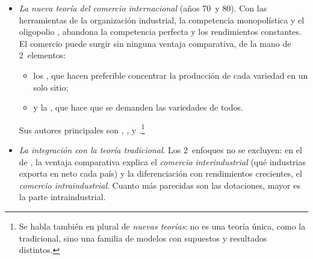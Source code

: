 \documentclass[11pt]{article}
\begin{document}
\begin{itemize}
\begin{itemize}
\begin{itemize}
    \begin{enumerate}
    \item una parte grande del comercio es intraindustrial: hacia 2006 era ya cerca de la mitad del comercio dentro de Europa occidental y de Norteamérica, medido a 5~dígitos\nocite{Brulhart2009Account};
    \item la apertura de los países desarrollados no ha dejado de crecer, cuando - predice que el comercio debería caer a medida que sus dotaciones se parecen: el comercio de bienes y servicios de los países de renta alta pasó del 31~\% al 60~\% de su PIB entre 1970 y 2024\nocite{BancoMundial2026Apertura};
    \item y los desarrollados comercian mucho entre sí: el comercio entre economías desarrolladas sigue siendo el mayor bloque del comercio mundial de bienes, un 36~\% en 2024\nocite{UNCTAD2026KeyStatistics}.
    \end{enumerate}
    La teoría tradicional puede generar algo de comercio intraindustrial con costes de transporte (comercio fronterizo de un bien voluminoso en las 2~direcciones) o mezclando las fuentes de ventaja comparativa\nocite{Gandolfo2014International}, pero no como un fenómeno general.
  \item \emph{La nueva teoría del comercio internacional} (años 70~y 80). Con las herramientas de la organización industrial, la competencia monopolística  y el oligopolio , abandona la competencia perfecta y los rendimientos constantes. El comercio puede surgir sin ninguna ventaja comparativa, de la mano de 2~elementos:
    \begin{itemize}
    \item los , que hacen preferible concentrar la producción de cada variedad en un solo sitio;
    \item y la , que hace que se demanden las variedades de todos.
    \end{itemize}
    Sus autores principales son , ,  y .\footnote{Se habla también en plural de \emph{nuevas teorías}: no es una teoría única, como la tradicional, sino una familia de modelos con supuestos y resultados distintos.}
  \item \emph{La integración con la teoría tradicional}. Los 2~enfoques no se excluyen: en el  de \textcite{HelpmanKrugman1985Market}, la ventaja comparativa explica el \emph{comercio interindustrial} (qué industrias exporta en neto cada país) y la diferenciación con rendimientos crecientes, el \emph{comercio intraindustrial}. Cuanto más parecidas son las dotaciones, mayor es la parte intraindustrial.

\end{itemize}
\end{itemize}
\end{itemize}
\end{document}
